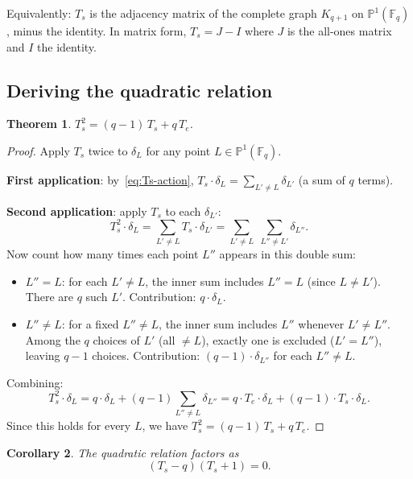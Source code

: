 \documentclass[12pt,a4paper]{article}
\newtheorem{theorem}{Theorem}[section]
\newtheorem{corollary}[theorem]{Corollary}
\theoremstyle{definition}
\theoremstyle{remark}
\newcommand{\F}{\mathbb{F}}
\newcommand{\PP}{\mathbb{P}}
\begin{document}
Equivalently: $T_s$ is the adjacency matrix of the complete graph
$K_{q+1}$ on $\PP^1(\F_q)$, minus the identity. In matrix form,
$T_s = J - I$ where $J$ is the all-ones matrix and $I$ the identity.

\subsection{Deriving the quadratic relation}

\begin{theorem}\label{thm:quadratic}
$T_s^2 = (q-1)\, T_s + q\, T_e$.
\end{theorem}

\begin{proof}
Apply $T_s$ twice to $\delta_L$ for any point $L \in \PP^1(\F_q)$.

\medskip\noindent\textbf{First application}: by~\eqref{eq:Ts-action},
$T_s \cdot \delta_L = \sum_{L' \neq L} \delta_{L'}$ (a sum of $q$
terms).

\medskip\noindent\textbf{Second application}: apply $T_s$ to each
$\delta_{L'}$:
\[
  T_s^2 \cdot \delta_L
  = \sum_{L' \neq L} T_s \cdot \delta_{L'}
  = \sum_{L' \neq L}\; \sum_{L'' \neq L'} \delta_{L''}.
\]
Now count how many times each point $L''$ appears in this double sum:

\begin{itemize}
\item \textbf{$L'' = L$}: for each $L' \neq L$, the inner sum
  includes $L'' = L$ (since $L \neq L'$). There are $q$ such $L'$.
  Contribution: $q \cdot \delta_L$.

\item \textbf{$L'' \neq L$}: for a fixed $L'' \neq L$, the inner sum
  includes $L''$ whenever $L' \neq L''$. Among the $q$ choices of
  $L'$ (all $\neq L$), exactly one is excluded ($L' = L''$), leaving
  $q - 1$ choices.
  Contribution: $(q-1) \cdot \delta_{L''}$ for each $L'' \neq L$.
\end{itemize}

Combining:
\[
  T_s^2 \cdot \delta_L
  = q \cdot \delta_L + (q-1) \sum_{L'' \neq L} \delta_{L''}
  = q \cdot T_e \cdot \delta_L + (q-1) \cdot T_s \cdot \delta_L.
\]
Since this holds for every $L$, we have $T_s^2 = (q-1)\,T_s + q\,T_e$.
\end{proof}

\begin{corollary}\label{cor:quadratic-factored}
The quadratic relation factors as
\begin{equation}\label{eq:quadratic}
  (T_s - q)(T_s + 1) = 0.
\end{equation}
\end{corollary}
\end{document}
